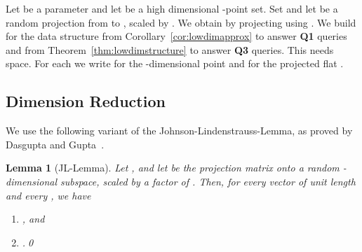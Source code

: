 \documentclass[a4paper,11pt]{paper}
\newtheorem{lemma}[theorem]{Lemma}
\begin{document}
Let  be a parameter
and let  be a high dimensional -point set.
Set  and
let  be a random projection from
 to , scaled by .
We obtain  by projecting  using .
We build for  the
data structure  from Corollary~\ref{cor:lowdimapprox} to answer
\textbf{Q1} queries and  from Theorem~\ref{thm:lowdimstructure}
to answer \textbf{Q3} queries.
This needs  space.
For each  we write  for the
-dimensional point  and  for the projected
flat .

\subsection{Dimension Reduction}\label{sec:dimReduct}

We use the following variant of the Johnson-Lindenstrauss-Lemma,
as proved by Dasgupta and Gupta~\cite[Lemma~2.2]{DasguptaGu03}.

\begin{lemma}[JL-Lemma]\label{lem:jl}
  Let , and let  be the projection
  matrix onto a random -dimensional subspace, scaled by a factor
  of .
  Then, for every vector  of unit length and every
  , we have
  \begin{enumerate}
    \item\label{itm:jl-up}
      , and
    \item\label{itm:jl-low}
      .\qed{}
  \end{enumerate}
\end{lemma}
\end{document}
